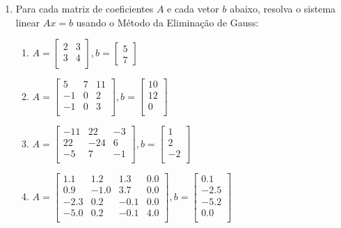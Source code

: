 \documentclass[a4paper]{article}
\begin{document}
\begin{enumerate}
\item Para cada matriz de coeficientes $A$ e cada vetor $b$ abaixo,
  resolva o sistema linear $Ax=b$ usando o Método da Eliminação de
  Gauss:
  \begin{enumerate}
  \item 
    $A = \begin{bmatrix}
        2 & 3\\
        3 & 4\\
      \end{bmatrix},
      b= \begin{bmatrix}
        5\\
        7
      \end{bmatrix}$

  \item
    $A = \begin{bmatrix}
      5 & 7 & 11\\
      -1 & 0 & 2\\
      -1 & 0 & 3\\
      \end{bmatrix},
      b= \begin{bmatrix}
        10\\
        12\\
        0\\
      \end{bmatrix}$

  \item
    $A = \begin{bmatrix}
      -11 & 22 & -3\\
      22 & -24 & 6\\
      -5 & 7 & -1\\
      \end{bmatrix},
      b= \begin{bmatrix}
        1\\
        2\\
        -2\\
      \end{bmatrix}$

  \item
    $A = \begin{bmatrix}
      1.1 & 1.2 & 1.3 & 0.0\\
      0.9 & -1.0 & 3.7 & 0.0\\
      -2.3 & 0.2 & -0.1 & 0.0\\
      -5.0 & 0.2 & -0.1 & 4.0\\
      \end{bmatrix},
      b= \begin{bmatrix}
        0.1\\
        -2.5\\
        -5.2\\
        0.0\\
      \end{bmatrix}$


\end{enumerate}
\end{enumerate}
\end{document}
